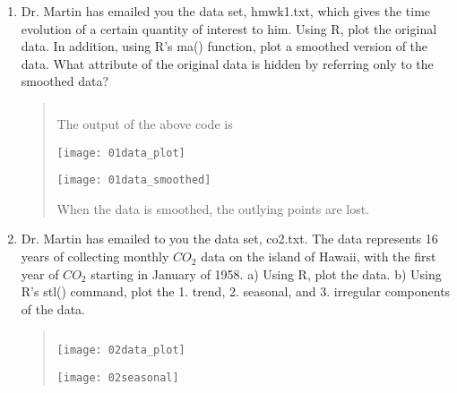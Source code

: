 \documentclass{hw}
\begin{document}

\begin{enumerate}
\item Dr. Martin has emailed you the data set, hmwk1.txt, which gives the time evolution of a certain
quantity of interest to him. Using R, plot the original data. In addition, using R’s ma() function, plot a
smoothed version of the data. What attribute of the original data is hidden by referring only to the
smoothed data?
\begin{quote}
\inputminted{r}{num_one.R}
The output of the above code is\\
\begin{minipage}{0.5\textwidth}
\texttt{[image: 01data\_plot]}
\end{minipage}
\begin{minipage}{0.5\textwidth}
\texttt{[image: 01data\_smoothed]}
\end{minipage}
When the data is smoothed, the outlying points are lost.
\end{quote}

\newpage
\item Dr. Martin has emailed to you the data set, co2.txt. The data represents 16 years of collecting
monthly $CO_{2}$ data on the island of Hawaii, with the first year of $CO_{2}$ starting in January of
1958. a) Using R, plot the data. b) Using R’s stl() command, plot the 1. trend, 2. seasonal, and 3.
irregular components of the data.
\begin{quote}
\inputminted{r}{num_two.R}
\begin{minipage}{0.5\textwidth}
\texttt{[image: 02data\_plot]}
\end{minipage}
\begin{minipage}{0.5\textwidth}
\texttt{[image: 02seasonal]}
\end{minipage}
\end{quote}


\end{enumerate}
\end{document}
